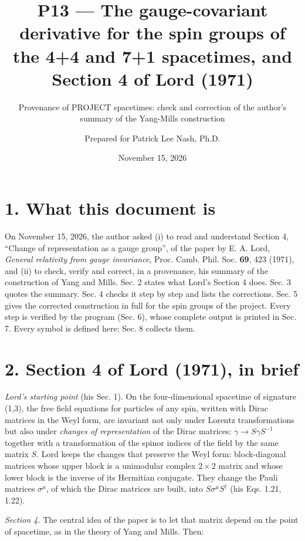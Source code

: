\documentclass[
  10pt,
]{article}
\title{P13 --- The gauge-covariant derivative for the spin groups of the
4+4 and 7+1 spacetimes, and Section 4 of Lord (1971)}
\subtitle{Provenance of PROJECT spacetimes: check and correction of the
author's summary of the Yang-Mills construction}
\author{Prepared for Patrick Lee Nash, Ph.D.}
\date{November 15, 2026}
\begin{document}
\maketitle

\hypertarget{what-this-document-is}{%
\section{1. What this document is}\label{what-this-document-is}}

On November 15, 2026, the author asked (i) to read and understand
Section 4, ``Change of representation as a gauge group'', of the paper
by E. A. Lord, \emph{General relativity from gauge invariance}, Proc.
Camb. Phil. Soc. \textbf{69}, 423 (1971), and (ii) to check, verify and
correct, in a provenance, his summary of the construction of Yang and
Mills. Sec. 2 states what Lord's Section 4 does. Sec. 3 quotes the
summary. Sec. 4 checks it step by step and lists the corrections. Sec. 5
gives the corrected construction in full for the spin groups of the
project. Every step is verified by the program (Sec. 6), whose complete
output is printed in Sec. 7. Every symbol is defined here; Sec. 8
collects them.

\hypertarget{section-4-of-lord-1971-in-brief}{%
\section{2. Section 4 of Lord (1971), in
brief}\label{section-4-of-lord-1971-in-brief}}

\emph{Lord's starting point} (his Sec. 1). On the four-dimensional
spacetime of signature (1,3), the free field equations for particles of
any spin, written with Dirac matrices in the Weyl form, are invariant
not only under Lorentz transformations but also under \emph{changes of
representation} of the Dirac matrices: \(\gamma\to S\gamma S^{-1}\)
together with a transformation of the spinor indices of the field by the
same matrix \(S\). Lord keeps the changes that preserve the Weyl form:
block-diagonal matrices whose upper block is a unimodular complex
\(2\times2\) matrix and whose lower block is the inverse of its
Hermitian conjugate. They change the Pauli matrices \(\sigma^\mu\), of
which the Dirac matrices are built, into \(S\sigma^\mu S^\dagger\) (his
Eqs. 1.21, 1.22).

\emph{Section 4.} The central idea of the paper is to let that matrix
depend on the point of spacetime, as in the theory of Yang and Mills.
Then:
\end{document}
